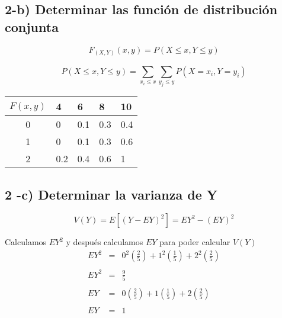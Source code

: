 \documentclass[12pt]{article}
\begin{document}
\subsection*{2-b)  Determinar las funci\'on de distribuci\'on conjunta}

\begin{equation*}
    F_{\left(X,Y\right)} \left(x,y\right) = P \left(X \le x , Y \le y\right)
\end{equation*}

\begin{equation*}
    P \left(X \le x , Y \le y\right) =  \sum_{x_i \le x}^{} \sum_{y_j \le y}^{}  P \left(X = x_i , Y = y_i\right)
\end{equation*}

\begin{center}
    \begin{tabular}{|c|l|l|l|l|}
        \hline
        $F\left(x,y\right)$ & 4 &  6 & 8 & 10 
        \\
        \hline
        0 & 0 &  0.1 & 0.3 & 0.4
        \\
        \hline
        1 & 0 &  0.1 & 0.3 & 0.6
        \\
        \hline
        2 & 0.2 &  0.4 & 0.6 & 1
        \\
        \hline
    \end{tabular}
\end{center}


\subsection*{2 -c) Determinar la varianza de Y}

\begin{equation*}
    V\left(Y\right) = E \left[\left(Y - EY\right)^2\right] = EY^2 - \left(EY\right)^2
\end{equation*}

Calculamos $EY^2$ y despu\'es calculamos $EY$ para poder calcular $V\left(Y\right)$
\begin{equation*}
    \begin{array}{rcl}
        EY^2 & = & \displaystyle 0^2 \left(\frac{2}{5} \right)  + 1^2  \left(\frac{1}{5}\right) + 2^2 \left( \frac{2}{5}\right)
        \\
        \\
        EY^2 & = & \displaystyle \frac{9}{5}
        \\
        \\
        EY   & = & \displaystyle 0 \left(\frac{2}{5} \right)  + 1  \left(\frac{1}{5}\right) + 2 \left( \frac{2}{5}\right)
        \\
        \\
        EY   & = & 1
    \end{array}
\end{equation*}
\end{document}
